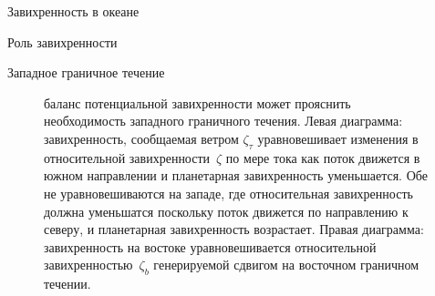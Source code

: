 \begin{chapter}{Завихренность в океане}
\begin{section}{Роль завихренности}
\begin{paragraph}{Западное граничное течение}
\begin{figure}[t!]
\caption{баланс потенциальной завихренности может прояснить
необходимость западного граничного течения. Левая диаграмма:
завихренность, сообщаемая ветром $\zeta_{\tau}$ уравновешивает изменения в
относительной завихренности~$\zeta$ по мере тока как поток движется в южном
направлении и планетарная завихренность уменьшается. Обе не
уравновешиваются на западе, где относительная завихренность должна
уменьшатся поскольку поток движется по направлению к северу, и
планетарная завихренность возрастает. Правая диаграмма: завихренность
на востоке уравновешивается относительной завихренностью~$\zeta_b$
генерируемой сдвигом на восточном граничном течении.}
\label{fig:westbdycurrent}
\vfill
\end{figure}
%
\end{paragraph}
\end{section}


\end{chapter}
